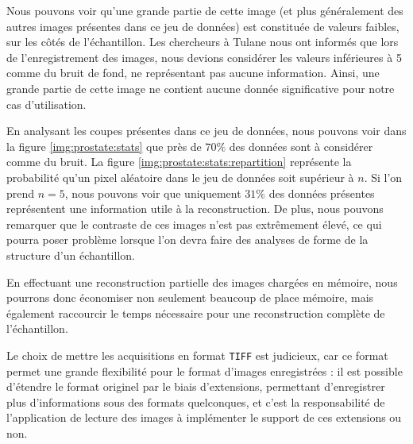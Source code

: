 {{        Nous pouvons voir qu'une grande partie de cette image (et plus généralement des autres images présentes dans ce jeu de données) est constituée de valeurs faibles, sur les côtés de l'échantillon. Les chercheurs à Tulane nous ont informés que lors de l'enregistrement des images, nous devions considérer les valeurs inférieures à 5 comme du bruit de fond, ne représentant pas aucune information. Ainsi, une grande partie de cette image ne contient aucune donnée significative pour notre cas d'utilisation.

        En analysant les coupes présentes dans ce jeu de données, nous pouvons voir dans la figure \ref{img:prostate:stats} que près de $70\%$ des données sont à considérer comme du bruit. La figure \ref{img:prostate:stats:repartition} représente la probabilité qu'un pixel aléatoire dans le jeu de données soit supérieur à $n$. Si l'on prend $n = 5$, nous pouvons voir que uniquement $31\%$ des données présentes représentent une information utile à la reconstruction. De plus, nous pouvons remarquer que le contraste de ces images n'est pas extrêmement élevé, ce qui pourra poser problème lorsque l'on devra faire des analyses de forme de la structure d'un échantillon.
        
        En effectuant une reconstruction partielle des images chargées en mémoire, nous pourrons donc économiser non seulement beaucoup de place mémoire, mais également raccourcir le temps nécessaire pour une reconstruction complète de l'échantillon.

        Le choix de mettre les acquisitions en format \texttt{TIFF} est judicieux, car ce format permet une grande flexibilité pour le format d'images enregistrées : il est possible d'étendre le format originel par le biais d'extensions, permettant d'enregistrer plus d'informations sous des formats quelconques, et c'est la responsabilité de l'application de lecture des images à implémenter le support de ces extensions ou non.
        
}}
